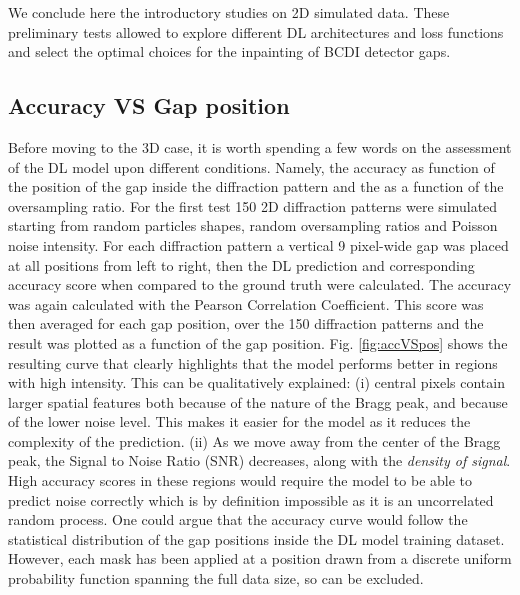 We conclude here the introductory studies on 2D simulated data. These preliminary tests allowed to explore 
different DL architectures and loss functions and select the optimal choices for the inpainting of BCDI detector
gaps. 

\subsection{Accuracy VS Gap position}

Before moving to the 3D case, it is worth spending a few words on the assessment of the DL model upon different conditions.
Namely, the accuracy as function of the position of the gap inside the diffraction pattern and the 
as a function of the oversampling ratio.
For the first test 150 2D diffraction patterns were simulated starting from random particles shapes, random oversampling ratios
and Poisson noise intensity. For each diffraction pattern a vertical 9 pixel-wide gap was placed at all positions
from left to right, then the DL prediction and corresponding accuracy score when compared to the ground truth were calculated. The 
accuracy was again calculated with the Pearson Correlation Coefficient. This score was then averaged for each 
gap position, over the 150 diffraction patterns and the result was plotted as a function of the gap position. Fig. \ref{fig:accVSpos} 
shows the resulting curve that clearly highlights that the model performs better in regions with high intensity. 
This can be qualitatively explained: (i) central pixels contain larger spatial features both because of the 
nature of the Bragg peak, and because of the lower noise level. This makes it easier for the model as it reduces the 
complexity of the prediction. (ii) As we move away from the center of the Bragg peak, the Signal to Noise Ratio (SNR) 
decreases, along with the \textit{density of signal}. High accuracy scores in these regions would require the model to be 
able to predict noise correctly which is by definition impossible as it is an uncorrelated random process. One could argue 
that the accuracy curve would follow the statistical distribution of the gap positions inside the DL model training dataset.
However, each mask has been applied at a position drawn from a discrete uniform probability function spanning the full
data size, so can be excluded. 

